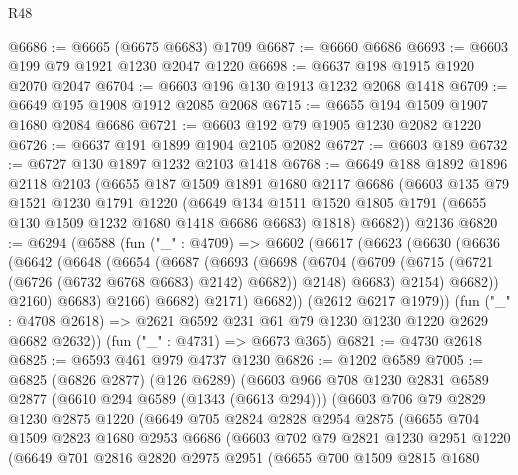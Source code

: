 \begin{lexlean}{R48}
\begin{coremodule}
@6686 := @6665 (@6675 @6683) @1709
@6687 := @6660 @6686
@6693 := @6603 @199 @79 @1921 @1230 @2047 @1220
@6698 := @6637 @198 @1915 @1920 @2070 @2047
@6704 := @6603 @196 @130 @1913 @1232 @2068 @1418
@6709 := @6649 @195 @1908 @1912 @2085 @2068
@6715 := @6655 @194 @1509 @1907 @1680 @2084 @6686
@6721 := @6603 @192 @79 @1905 @1230 @2082 @1220
@6726 := @6637 @191 @1899 @1904 @2105 @2082
@6727 := @6603 @189
@6732 := @6727 @130 @1897 @1232 @2103 @1418
@6768 := @6649
    @188
    @1892
    @1896
    @2118
    @2103
    (@6655
      @187
      @1509
      @1891
      @1680
      @2117
      @6686
      (@6603
        @135
        @79
        @1521
        @1230
        @1791
        @1220
        (@6649 @134 @1511 @1520 @1805 @1791 (@6655 @130 @1509 @1232 @1680 @1418 @6686 @6683) @1818)
        @6682))
    @2136
@6820 := @6294
    (@6588
      (fun ("_" : @4709) =>
      @6602
        (@6617
          (@6623
            (@6630
              (@6636
                (@6642
                  (@6648
                    (@6654
                      (@6687
                        (@6693
                          (@6698
                            (@6704
                              (@6709 (@6715 (@6721 (@6726 (@6732 @6768 @6683) @2142) @6682)) @2148)
                              @6683)
                            @2154)
                          @6682))
                      @2160)
                    @6683)
                  @2166)
                @6682)
              @2171)
            @6682))
        (@2612 @6217 @1979))
      (fun ("_" : @4708 @2618) => @2621 @6592 @231 @61 @79 @1230 @1230 @1220 @2629 @6682 @2632))
    (fun ("_" : @4731) => @6673 @365)
@6821 := @4730 @2618
@6825 := @6593 @461 @979 @4737 @1230
@6826 := @1202 @6589
@7005 := @6825
    (@6826 @2877)
    (@126 @6289)
    (@6603
      @966
      @708
      @1230
      @2831
      @6589
      @2877
      (@6610 @294 @6589 (@1343 (@6613 @294)))
      (@6603
        @706
        @79
        @2829
        @1230
        @2875
        @1220
        (@6649
          @705
          @2824
          @2828
          @2954
          @2875
          (@6655
            @704
            @1509
            @2823
            @1680
            @2953
            @6686
            (@6603
              @702
              @79
              @2821
              @1230
              @2951
              @1220
              (@6649
                @701
                @2816
                @2820
                @2975
                @2951
                (@6655
                  @700
                  @1509
                  @2815
                  @1680

\end{coremodule}
\end{lexlean}
